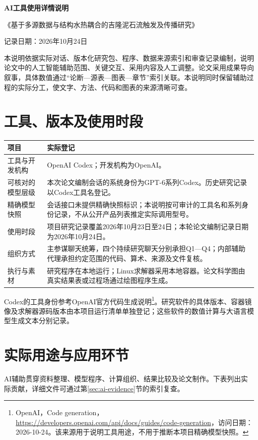 \documentclass[UTF8,a4paper,zihao=-4,fontset=none]{ctexart}
\begin{document}
\begin{center}
{\LARGE\bfseries AI工具使用详情说明}\par\vspace{0.6em}
{\large 《基于多源数据与结构水热耦合的吉隆泥石流触发及传播研究》}\par
\vspace{0.5em}记录日期：2026年10月24日
\end{center}

本说明依据实际对话、版本化研究包、程序、数据来源索引和审查记录编制，说明论文中的人工智能辅助范围、关键交互、采用内容及人工调整。论文采用成果导向叙事，具体数值通过“论断—源表—图表—章节”索引关联。本说明同时保留辅助过程的实际分工，使文字、方法、代码和图表的来源清晰可查。

\section{工具、版本及使用时段}
\begin{table}[H]\centering\small
\begin{tabularx}{\textwidth}{p{3.1cm}Y}
\toprule 项目 & 实际登记 \\
\midrule
工具与开发机构 & OpenAI Codex；开发机构为OpenAI。 \\
可核对的模型层级 & 本次论文编制会话的系统身份为GPT-6系列Codex。历史研究记录以Codex工具名登记。 \\
精确模型快照 & 会话接口未提供精确快照标识；本说明按可审计的工具名和系列身份记录，不从公开产品列表推定实际调用型号。 \\
使用时段 & 项目研究记录覆盖2026年10月23日至24日；本轮论文编制记录日期为2026年10月24日。 \\
组织方式 & 主参谋聊天统筹，四个持续研究聊天分别承担Q1—Q4；内部辅助代理承担约定范围的代码、算术、来源及文件复核。 \\
执行与素材 & 研究程序在本地运行；Linux求解器采用本地容器。论文科学图由真实结果表或过程场通过绘图程序生成。 \\
\bottomrule
\end{tabularx}
\end{table}

Codex的工具身份参考OpenAI官方代码生成说明\footnote{OpenAI，Code generation，\url{https://developers.openai.com/api/docs/guides/code-generation}，访问日期：2026-10-24。该来源用于说明工具用途，不用于推断本项目精确模型快照。}。研究软件的具体版本、容器镜像及求解器源码版本由本项目运行清单单独登记；这些软件的数值计算与大语言模型生成文本分别记录。

\section{实际用途与应用环节}
AI辅助贯穿资料整理、模型程序、计算组织、结果比较及论文制作。下表列出实际贡献，详细文件可通过第\ref{sec:ai-evidence}节的索引复查。
\end{document}
